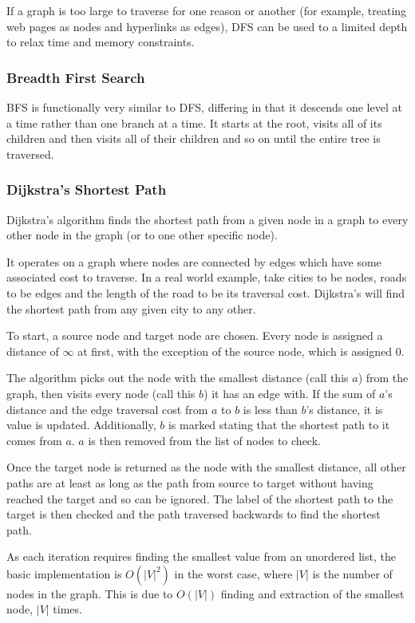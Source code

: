\documentclass[]{article}
\begin{document}
If a graph is too large to traverse for one reason or another (for example, treating web pages as nodes and hyperlinks as edges), DFS can be used to a limited depth to relax time and memory constraints.

\subsubsection{Breadth First Search}

BFS is functionally very similar to DFS, differing in that it descends one level at a time rather than one branch at a time. It starts at the root, visits all of its children and then visits all of their children and so on until the entire tree is traversed.

\subsubsection{Dijkstra's Shortest Path}

Dijkstra's algorithm finds the shortest path from a given node in a graph to every other node in the graph (or to one other specific node).

It operates on a graph where nodes are connected by edges which have some associated cost to traverse. In a real world example, take cities to be nodes, roads to be edges and the length of the road to be its traversal cost. Dijkstra's will find the shortest path from any given city to any other.

To start, a source node and target node are chosen. Every node is assigned a distance of $\infty$ at first, with the exception of the source node, which is assigned 0.

The algorithm picks out the node with the smallest distance (call this $a$) from the graph, then visits every node (call this $b$) it has an edge with. If the sum of $a$'s distance and the edge traversal cost from $a$ to $b$ is less than $b$'s distance, it is value is updated. Additionally, $b$ is marked stating that the shortest path to it comes from $a$. $a$ is then removed from the list of nodes to check.

Once the target node is returned as the node with the smallest distance, all other paths are at least as long as the path from source to target without having reached the target and so can be ignored. The label of the shortest path to the target is then checked and the path traversed backwards to find the shortest path.

As each iteration requires finding the smallest value from an unordered list, the basic implementation is $O(|V|^2)$ in the worst case, where $|V|$ is the number of nodes in the graph. This is due to $O(|V|)$ finding and extraction of the smallest node, $|V|$ times.
\end{document}

